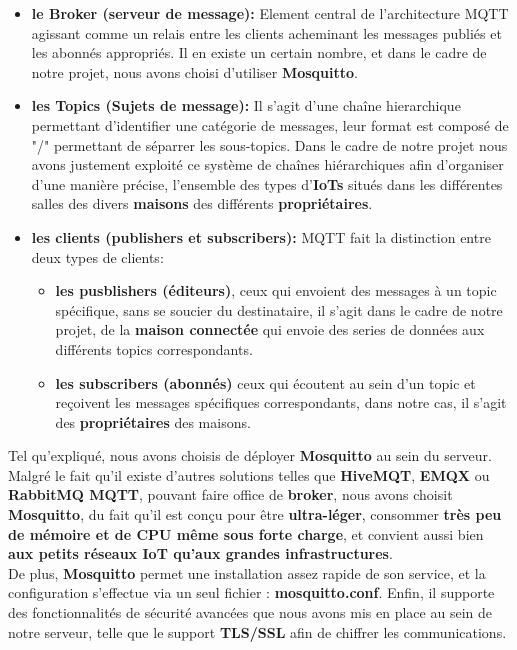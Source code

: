\documentclass[10pt, a4paper]{report}
\begin{document}
	\begin{itemize}
		\item \textbf{le Broker (serveur de message):} Element central de l'architecture MQTT agissant comme un relais entre les clients acheminant les messages publiés et les abonnés appropriés. Il en existe un certain nombre, et dans le cadre de notre projet, nous avons choisi d'utiliser \textbf{Mosquitto}.
		
		\item \textbf{les Topics (Sujets de message):} Il s'agit d'une chaîne hierarchique permettant d'identifier une catégorie de messages, leur format est composé de "/" permettant de séparrer les sous-topics. Dans le cadre de notre projet nous avons justement exploité ce système de chaînes hiérarchiques afin d'organiser d'une manière précise, l'ensemble des types d'\textbf{IoTs} situés dans les différentes salles des divers \textbf{maisons} des différents \textbf{propriétaires}. 
		
		\item \textbf{les clients (publishers et subscribers):} MQTT fait la distinction entre deux types de clients: 
		\begin{itemize}
			\item \textbf{les pusblishers (éditeurs)}, ceux qui envoient des messages à un topic spécifique, sans se soucier du destinataire, il s'agit dans le cadre de notre projet, de la \textbf{maison connectée} qui envoie des series de données aux différents topics correspondants. 
			
			\item \textbf{les subscribers (abonnés)} ceux qui écoutent au sein d'un topic et reçoivent les messages spécifiques correspondants, dans notre cas, il s'agit des \textbf{propriétaires} des maisons.
		\end{itemize}
	\end{itemize}
	\vspace{0.5cm}
	
	Tel qu'expliqué, nous avons choisis de déployer \textbf{Mosquitto} au sein du serveur. Malgré le fait qu'il existe d'autres solutions telles que \textbf{HiveMQT}, \textbf{EMQX} ou \textbf{RabbitMQ MQTT}, pouvant faire office de \textbf{broker}, nous avons choisit \textbf{Mosquitto}, du fait qu'il est conçu pour être \textbf{ultra-léger}, consommer \textbf{très peu de mémoire et de CPU même sous forte charge}, et convient aussi bien \textbf{aux petits réseaux IoT qu'aux grandes infrastructures}.\\
	De plus, \textbf{Mosquitto} permet une installation assez rapide de son service, et la configuration s'effectue via un seul fichier : \textbf{mosquitto.conf}. Enfin, il supporte des fonctionnalités de sécurité avancées que nous avons mis en place au sein de notre serveur, telle que le support \textbf{TLS/SSL} afin de chiffrer les communications.
	
\end{document}
